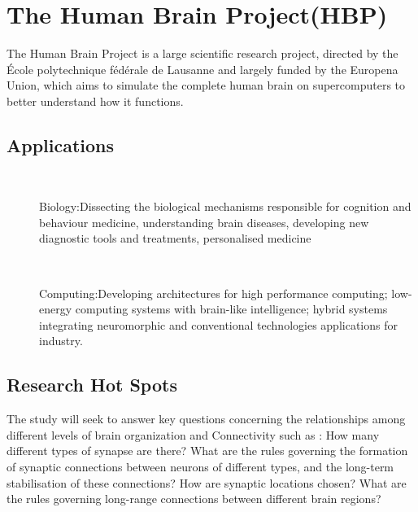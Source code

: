 \documentclass{article}
\let\Item\item
\newcommand\SpecialItem{\renewcommand\item[1][]{\Item[\textbullet~\bfseries##1]}}
\begin{document}
\section*{The Human Brain Project(HBP)}
The Human Brain Project is a large scientific research project, directed by the École polytechnique fédérale de Lausanne and largely funded by the Europena Union, which aims to simulate the complete human brain on supercomputers to better understand how it functions.
\subsection*{Applications}
\SpecialItem
\begin{description}
\item Biology:Dissecting the biological mechanisms responsible for cognition and behaviour medicine, understanding brain diseases, developing new diagnostic tools and treatments, personalised medicine
\cite{Koch}
\newline \item Computing:Developing architectures for high performance computing; low-energy computing systems with brain-like intelligence; hybrid systems integrating neuromorphic and conventional technologies applications for industry.
\end{description}
\subsection*{Research Hot Spots}
The study will seek to answer key questions concerning the relationships among different levels of brain organization and Connectivity such as :
\newline How many different types of synapse are there? What are the rules governing the formation of synaptic connections between neurons of different types, and the long-term stabilisation of these connections? How are synaptic locations chosen? What are the rules governing long-range connections between different brain regions?
\end{document}
